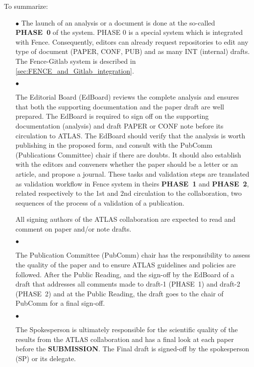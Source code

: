 To summarize:
\begin{itemize}

    \item[\tiny$\bullet$]
The launch of an analysis or a document is done at the so-called \textbf{PHASE~0} of the system. PHASE 0 is a special system which is integrated with Fence. Consequently, editors can already request repositories to edit any type of document (PAPER, CONF, PUB) and as many INT (internal)  drafts. The Fence-Gitlab system is described in \cref{sec:FENCE_and_Gitlab_integration}.

    \item[\tiny$\bullet$]
    
The Editorial Board (EdBoard) reviews the complete analysis and ensures that both the supporting documentation and the paper draft are well prepared. The EdBoard is required to sign off on the supporting documentation (analysis) and draft PAPER or CONF note before its circulation to ATLAS. The EdBoard should verify that the analysis is worth publishing in the proposed form, and consult with the PubComm (Publications Committee) chair if there are doubts. It should also establish with the editors and conveners whether the paper should be a letter or an article, and propose a journal. These tasks and validation steps are translated as validation workflow in Fence system in theirs \textbf{PHASE~1} and \textbf{PHASE~2}, related respectively to the 1st and 2nd circulation to the collaboration, two sequences of the process of a validation of a publication.

All signing authors of the ATLAS collaboration are expected to read and comment on paper and/or note drafts.

    \item[\tiny$\bullet$]

The Publication Committee (PubComm) chair has the responsibility to assess the quality of the paper and to ensure ATLAS guidelines and policies are followed. After the Public Reading, and the sign-off by the EdBoard of a draft  that addresses all comments made to draft-1 (PHASE~1) and draft-2 (PHASE~2)  and at the Public Reading, the draft goes to the chair of PubComm for a final sign-off.

    \item[\tiny$\bullet$]

The Spokesperson is ultimately responsible for the scientific quality of the results from the ATLAS collaboration and has a final look at each paper before the \textbf{SUBMISSION}. The Final draft  is signed-off by the spokesperson (SP) or its delegate. 


\end{itemize}
